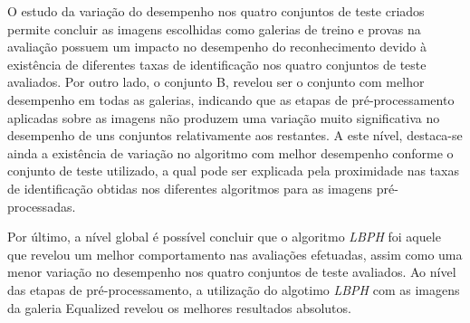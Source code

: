 O estudo da variação do desempenho nos quatro conjuntos de teste criados permite concluir as imagens escolhidas como galerias de treino e provas na avaliação possuem um impacto no desempenho do reconhecimento devido à existência de diferentes taxas de identificação nos quatro conjuntos de teste avaliados. Por outro lado, o conjunto B, revelou ser o conjunto com melhor desempenho em todas as galerias, indicando que as etapas de pré-processamento aplicadas sobre as imagens não produzem uma variação muito significativa no desempenho de uns conjuntos relativamente aos restantes. A este nível, destaca-se ainda a existência de variação no algoritmo com melhor desempenho conforme o conjunto de teste utilizado, a qual pode ser explicada pela proximidade nas taxas de identificação obtidas nos diferentes algoritmos para as imagens pré-processadas. 

Por último, a nível global é possível concluir que o algoritmo \textit{LBPH} foi aquele que revelou um melhor comportamento nas avaliações efetuadas, assim como uma menor variação no desempenho nos quatro conjuntos de teste avaliados. Ao nível das etapas de pré-processamento, a utilização do algotimo \textit{LBPH} com as imagens da galeria Equalized revelou os melhores resultados absolutos.